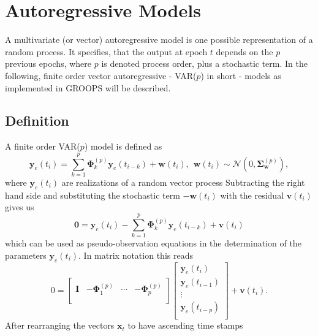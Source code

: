 \section{Autoregressive Models}\label{fundamentals.autoregressiveModel}
A multivariate (or vector) autoregressive model is one possible representation of a random process.
It specifies, that the output at epoch $t$ depends on the $p$ previous epochs, where $p$ is denoted process order,
plus a stochastic term.
In the following, finite order vector autoregressive - VAR($p$) in short - models as implemented in GROOPS will be described.

\subsection{Definition}

A finite order VAR($p$) model is defined as
\begin{equation}
  \mathbf{y}_e(t_i) = \sum_{k=1}^p \mathbf{\Phi}^{(p)}_k\mathbf{y}_e(t_{i-k}) + \mathbf{w}(t_i),
  \hspace{5pt} \mathbf{w}(t_i) \sim \mathcal{N}(0, \mathbf{\Sigma}^{(p)}_\mathbf{w}),
\end{equation}
where $\mathbf{y}_e(t_i)$ are realizations of a random vector process
Subtracting the right hand side and substituting the stochastic term $-\mathbf{w}(t_i)$ with the residual $\mathbf{v}(t_i)$ gives us
\begin{equation}
  \mathbf{0}  = \mathbf{y}_e(t_i) - \sum_{k=1}^p \mathbf{\Phi}^{(p)}_k\mathbf{y}_e(t_{i-k}) + \mathbf{v}(t_i)
\end{equation}
which can be used as pseudo-observation equations in the determination of the parameters $\mathbf{y}_e(t_i)$.
In matrix notation this reads
\begin{equation}
  0 =
  \begin{bmatrix}
    \mathbf{I} & -\mathbf{\Phi}^{(p)}_1 & \cdots & -\mathbf{\Phi}^{(p)}_p \\
  \end{bmatrix}
  \begin{bmatrix}
    \mathbf{y}_e(t_i) \\
    \mathbf{y}_e(t_{i-1}) \\
    \vdots \\
    \mathbf{y}_e(t_{i-p}) \\
  \end{bmatrix}
  + \mathbf{v}(t_i).
\end{equation}
After rearranging the vectors $\mathbf{x}_t$ to have ascending time stamps
